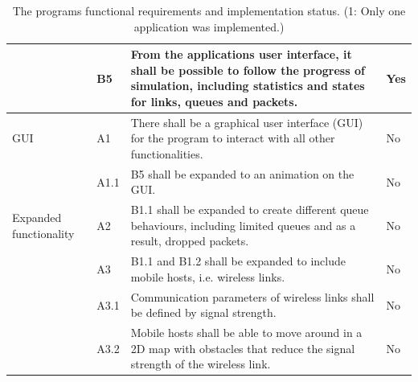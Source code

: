\begin{table}[!htbp]
{\begin{tabular}{p{}|p{}|p{}|p{}}
& B5        & From the applications user interface, it shall be possible to follow the progress of simulation, including statistics and states for links, queues and packets. & Yes \\
\hline GUI
& A1        & There shall be a graphical user interface (GUI) for the program to interact with all other functionalities. & No\\
& A1.1      & B5 shall be expanded to an animation on the GUI. & No\\
\hline Expanded functionality
& A2        & B1.1 shall be expanded to create different queue behaviours, including limited queues and as a result, dropped packets. & No\\
& A3        & B1.1 and B1.2 shall be expanded to include mobile hosts, i.e. wireless links. & No\\
& A3.1      & Communication parameters of wireless links shall be defined by signal strength. & No\\
& A3.2      & Mobile hosts shall be able to move around in a 2D map with obstacles that reduce the signal strength of the wireless link. & No\\
\hline
\end{tabular}
}
\caption{The programs functional requirements and implementation status. (1: Only one application was implemented.) }
\label{table:requirements}
\end{table}

